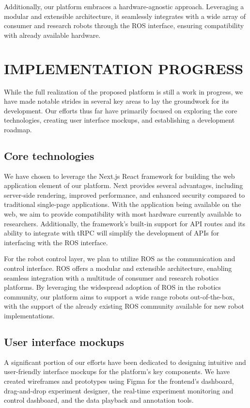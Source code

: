 \documentclass[letterpaper, 10 pt, conference]{ieeeconf}
\begin{document}
Additionally, our platform embraces a hardware-agnostic approach. Leveraging a modular and extensible architecture, it seamlessly integrates with a wide array of consumer and research robots through the ROS interface, ensuring compatibility with already available hardware.


\section{IMPLEMENTATION PROGRESS}

While the full realization of the proposed platform is still a work in progress, we have made notable strides in several key areas to lay the groundwork for its development. Our efforts thus far have primarily focused on exploring the core technologies, creating user interface mockups, and establishing a development roadmap.

\subsection{Core technologies}

We have chosen to leverage the Next.js React framework for building the web application element of our platform. Next provides several advantages, including server-side rendering, improved performance, and enhanced security compared to traditional single-page applications. With the application being available on the web, we aim to provide compatibility with most hardware currently available to researchers. Additionally, the framework's built-in support for API routes and its ability to integrate with tRPC will simplify the development of APIs for interfacing with the ROS interface.

For the robot control layer, we plan to utilize ROS as the communication and control interface. ROS offers a modular and extensible architecture, enabling seamless integration with a multitude of consumer and research robotics platforms. By leveraging the widespread adoption of ROS in the robotics community, our platform aims to support a wide range robots out-of-the-box, with the support of the already existing ROS community available for new robot implementations.

\subsection{User interface mockups}

A significant portion of our efforts have been dedicated to designing intuitive and user-friendly interface mockups for the platform's key components. We have created wireframes and prototypes using Figma for the frontend's dashboard, drag-and-drop experiment designer, the real-time experiment monitoring and control dashboard, and the data playback and annotation tools.
\end{document}
